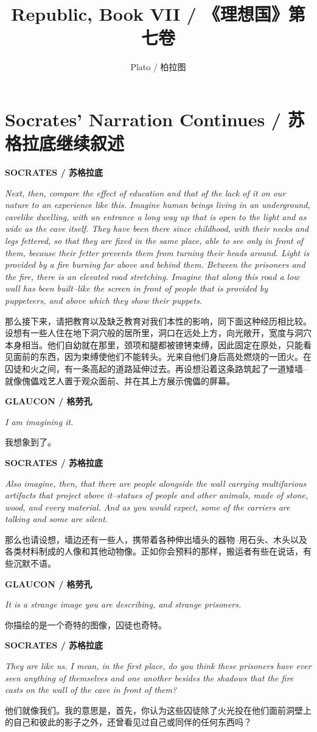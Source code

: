 \documentclass[UTF8]{ctexart}
\title{Republic, Book VII / 《理想国》第七卷}
\author{Plato / 柏拉图}
\date{}
\newcommand{\speaker}[2]{\par\medskip\noindent\textbf{#1 / #2}\par}
\newcommand{\en}[1]{\noindent\textit{#1}\par}
\newcommand{\zh}[1]{\noindent #1\par}
\begin{document}
\maketitle

\section*{Socrates' Narration Continues / 苏格拉底继续叙述}

\speaker{SOCRATES}{苏格拉底}
\en{Next, then, compare the effect of education and that of the lack of it on our nature to an experience like this. Imagine human beings living in an underground, cavelike dwelling, with an entrance a long way up that is open to the light and as wide as the cave itself. They have been there since childhood, with their necks and legs fettered, so that they are fixed in the same place, able to see only in front of them, because their fetter prevents them from turning their heads around. Light is provided by a fire burning far above and behind them. Between the prisoners and the fire, there is an elevated road stretching. Imagine that along this road a low wall has been built--like the screen in front of people that is provided by puppeteers, and above which they show their puppets.}
\zh{那么接下来，请把教育以及缺乏教育对我们本性的影响，同下面这种经历相比较。设想有一些人住在地下洞穴般的居所里，洞口在远处上方，向光敞开，宽度与洞穴本身相当。他们自幼就在那里，颈项和腿都被镣铐束缚，因此固定在原处，只能看见面前的东西，因为束缚使他们不能转头。光来自他们身后高处燃烧的一团火。在囚徒和火之间，有一条高起的道路延伸过去。再设想沿着这条路筑起了一道矮墙--就像傀儡戏艺人置于观众面前、并在其上方展示傀儡的屏幕。}

\speaker{GLAUCON}{格劳孔}
\en{I am imagining it.}
\zh{我想象到了。}

\speaker{SOCRATES}{苏格拉底}
\en{Also imagine, then, that there are people alongside the wall carrying multifarious artifacts that project above it--statues of people and other animals, made of stone, wood, and every material. And as you would expect, some of the carriers are talking and some are silent.}
\zh{那么也请设想，墙边还有一些人，携带着各种伸出墙头的器物--用石头、木头以及各类材料制成的人像和其他动物像。正如你会预料的那样，搬运者有些在说话，有些沉默不语。}

\speaker{GLAUCON}{格劳孔}
\en{It is a strange image you are describing, and strange prisoners.}
\zh{你描绘的是一个奇特的图像，囚徒也奇特。}

\speaker{SOCRATES}{苏格拉底}
\en{They are like us. I mean, in the first place, do you think these prisoners have ever seen anything of themselves and one another besides the shadows that the fire casts on the wall of the cave in front of them?}
\zh{他们就像我们。我的意思是，首先，你认为这些囚徒除了火光投在他们面前洞壁上的自己和彼此的影子之外，还曾看见过自己或同伴的任何东西吗？}
\end{document}
